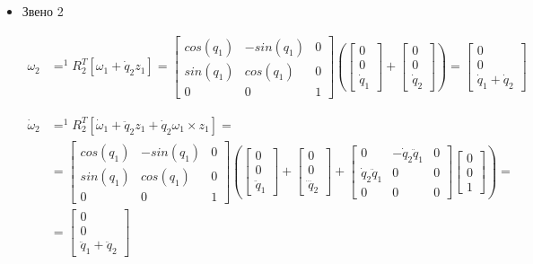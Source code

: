 \documentclass[a4paper,14pt]{extreport}
\begin{document}
\begin{itemize}
	\item Звено 2
	
\begin{align*}
\omega_2 &= ^1R_2^T [\omega_1 + \dot q_2 z_1] = 
\begin{bmatrix}
cos(q_1) & -sin(q_1) & 0\\
sin(q_1)& cos(q_1) &0\\
0&0 &1
\end{bmatrix}
\left(
\begin{bmatrix}
0\\
0\\
\dot q_1
\end{bmatrix}
+
\begin{bmatrix}
0\\
0\\
\dot q_2
\end{bmatrix}
\right)
=
\begin{bmatrix}
0\\
0\\
\dot q_1 + \dot q_2
\end{bmatrix}
\end{align*}
	
\begin{align*}
\dot \omega_2 &= ^1R_2^T [\dot \omega_1 + \ddot q_2 z_1 + \dot q_2 \omega_1 \times z_1] = \\
&= 
\begin{bmatrix}
cos(q_1) & -sin(q_1) & 0\\
sin(q_1)& cos(q_1) &0\\
0&0 &1
\end{bmatrix}
\left(
\begin{bmatrix}
0\\
0\\
\ddot q_1
\end{bmatrix}
+
\begin{bmatrix}
0\\
0\\
\dddot q_2
\end{bmatrix}
+
\begin{bmatrix}
0 & -\dot q_2 \ddot q_1 & 0\\
\dot q_2 \ddot q_1 & 0 & 0\\
0 & 0 & 0
\end{bmatrix}
\begin{bmatrix}
0\\
0\\
1
\end{bmatrix}
\right)
=\\
&=
\begin{bmatrix}
0\\
0\\
\ddot q_1 + \ddot q_2
\end{bmatrix}
\end{align*}


\end{itemize}
\end{document}
